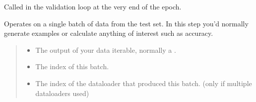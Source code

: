 \documentclass[letterpaper,10pt,english]{sphinxmanual}
\begin{document}
\begin{fulllineitems}
\begin{fulllineitems}
\end{fulllineitems}


\begin{fulllineitems}
\label{\detokenize{train:train.PcrCNN.on_validation_epoch_end}}
\pysigstartsignatures
\pysiglinewithargsret
{}
{}
{}
\pysigstopsignatures
\sphinxAtStartPar
Called in the validation loop at the very end of the epoch.

\end{fulllineitems}


\begin{fulllineitems}
\label{\detokenize{train:train.PcrCNN.shared_step}}
\pysigstartsignatures
\pysiglinewithargsret
{}
{}
{}
\pysigstopsignatures
\end{fulllineitems}


\begin{fulllineitems}
\label{\detokenize{train:train.PcrCNN.test_step}}
\pysigstartsignatures
\pysiglinewithargsret
{}
{\sphinxparamcomma {}}
{}
\pysigstopsignatures
\sphinxAtStartPar
Operates on a single batch of data from the test set. In this step you’d normally generate examples or
calculate anything of interest such as accuracy.
\begin{quote}\begin{description}
\begin{itemize}
\item {} 
\sphinxAtStartPar
{} \textendash{} The output of your data iterable, normally a .

\item {} 
\sphinxAtStartPar
{} \textendash{} The index of this batch.

\item {} 
\sphinxAtStartPar
{} \textendash{} The index of the dataloader that produced this batch.
(only if multiple dataloaders used)


\end{itemize}
\end{description}
\end{quote}
\end{fulllineitems}
\end{fulllineitems}
\end{document}
